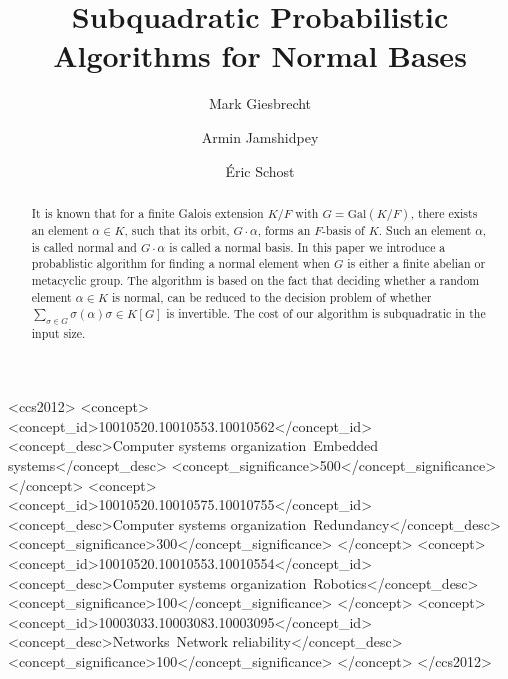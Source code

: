 \documentclass[sigconf]{acmart}
\theoremstyle{acmplain}
\begin{document}
\title{Subquadratic Probabilistic Algorithms for Normal Bases}


\author{Mark Giesbrecht
}

\author{Armin Jamshidpey}

\author{\'Eric Schost}


\renewcommand{\shortauthors}{M. Giesbrecht et al.}




\begin{abstract}
  It is known that for a finite Galois extension $K/F$ with
  $G = \mathrm{Gal}(K/F)$, there exists an element $\alpha \in K$,
  such that its orbit, $G\cdot\alpha$, forms an $F$-basis of $K$. Such
  an element $\alpha$, is called normal and $G\cdot \alpha$ is called
  a normal basis. In this paper we introduce a probablistic algorithm
  for finding a normal element when $G$ is either a finite abelian or
  metacyclic group. The algorithm is based on the fact that deciding
  whether a random element $\alpha \in K$ is normal, can be reduced to
  the decision problem of whether
  $\sum_{\sigma \in G} \sigma(\alpha)\sigma \in K[G]$ is invertible.
  The cost of our algorithm is subquadratic in the input size.
\end{abstract}

%
%
\begin{CCSXML}
<ccs2012>
 <concept>
  <concept_id>10010520.10010553.10010562</concept_id>
  <concept_desc>Computer systems organization~Embedded systems</concept_desc>
  <concept_significance>500</concept_significance>
 </concept>
 <concept>
  <concept_id>10010520.10010575.10010755</concept_id>
  <concept_desc>Computer systems organization~Redundancy</concept_desc>
  <concept_significance>300</concept_significance>
 </concept>
 <concept>
  <concept_id>10010520.10010553.10010554</concept_id>
  <concept_desc>Computer systems organization~Robotics</concept_desc>
  <concept_significance>100</concept_significance>
 </concept>
 <concept>
  <concept_id>10003033.10003083.10003095</concept_id>
  <concept_desc>Networks~Network reliability</concept_desc>
  <concept_significance>100</concept_significance>
 </concept>
</ccs2012>  
\end{CCSXML}
\end{document}
